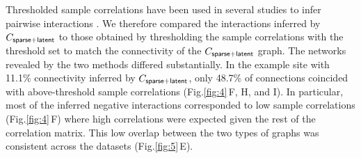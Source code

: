\documentclass[10pt]{article}
\newcommand{\figref}[2]{Fig.\;\ref{fig:#1}\,#2}
\begin{document}
Thresholded sample correlations have been used in several studies to infer pairwise interactions \cite{Golshani:2009, Feldt:2011, Malmersjo:2013}.  We therefore compared the interactions inferred by $C_{\sf sparse+latent}$ to those obtained by thresholding the sample correlations with the threshold set to match the connectivity of the $C_{\sf sparse+latent}$ graph.  The networks revealed by the two methods differed substantially. In the example site with 11.1\% connectivity inferred by $C_{\sf sparse+latent}$, only 48.7\% of connections coincided with above-threshold sample correlations (\figref{4}{F, H, and I}). In particular, most of the inferred negative interactions corresponded to low sample correlations (\figref{4}{F}) where high correlations were expected given the rest of the correlation matrix.  This low overlap between the two types of graphs was consistent across the datasets (\figref{5}{E}). 
\end{document}
